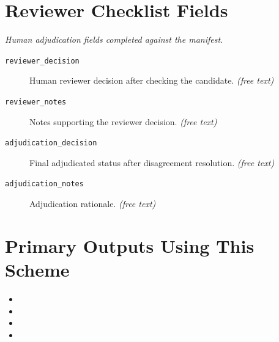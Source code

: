 \documentclass[11pt]{article}
\begin{document}
\section*{Reviewer Checklist Fields}
{\small\itshape Human adjudication fields completed against the manifest.}\par\smallskip
\begin{description}
\item[\texttt{reviewer\_decision}] Human reviewer decision after checking the candidate. \textit{(free text)}
\item[\texttt{reviewer\_notes}] Notes supporting the reviewer decision. \textit{(free text)}
\item[\texttt{adjudication\_decision}] Final adjudicated status after disagreement resolution. \textit{(free text)}
\item[\texttt{adjudication\_notes}] Adjudication rationale. \textit{(free text)}
\end{description}

\section*{Primary Outputs Using This Scheme}
\begin{itemize}
\item {}
\item {}
\item {}
\item {}
\end{itemize}
\end{document}
